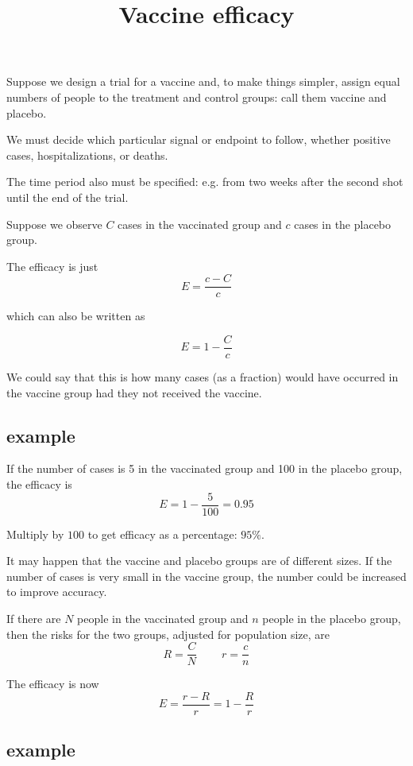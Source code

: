 \documentclass[11pt, oneside]{article}
\title{Vaccine efficacy}
\date{}
\begin{document}
\maketitle
\Large


Suppose we design a trial for a vaccine and, to make things simpler, assign equal numbers of people to the treatment and control groups:  call them vaccine and placebo.

We must decide which particular signal or endpoint to follow, whether positive cases, hospitalizations, or deaths.  

The time period also must be specified:  e.g. from two weeks after the second shot until the end of the trial.

Suppose we observe $C$ cases in the vaccinated group and $c$ cases in the placebo group.

The efficacy is just
\[ E = \frac{c - C}{c} \]

which can also be written as

\[ E = 1 - \frac{C}{c}  \]

We could say that this is how many cases (as a fraction) would have occurred in the vaccine group had they not received the vaccine.

\subsection*{example}

If the number of cases is 5 in the vaccinated group and 100 in the placebo group, the efficacy is
\[ E = 1 - \frac{5}{100} = 0.95 \]

Multiply by $100$ to get efficacy as a percentage:  $95 \%$.

It may happen that the vaccine and placebo groups are of different sizes.  If the number of cases is very small in the vaccine group, the number could be increased to improve accuracy.

If there are $N$ people in the vaccinated group and $n$ people in the placebo group, then the risks for the two groups, adjusted for population size, are
\[ R = \frac{C}{N} \ \ \ \ \ \ \ \ \ \  r = \frac{c}{n}  \]

The efficacy is now
\[ E = \frac{r - R}{r} = 1 - \frac{R}{r}  \]

\subsection*{example}
\end{document}
